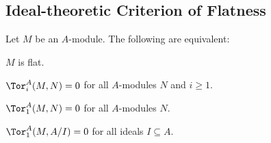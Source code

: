 \subsection{Ideal-theoretic Criterion of Flatness}
\begin{theorem}
    \label{thm:ideal_flat}
    Let $M$ be an $A$-module. The following are equivalent:
    \begin{alphenum}
        \item $M$ is flat.
        \item $\Tor_i^A(M,N) = 0$ for all $A$-modules $N$ and $i\ge 1$.
        \item $\Tor_1^A(M,N)=0$ for all $A$-modules $N$.
        \item $\Tor_1^A(M, A/I) = 0$ for all ideals $I\subseteq A$.
    \end{alphenum}
\end{theorem}
